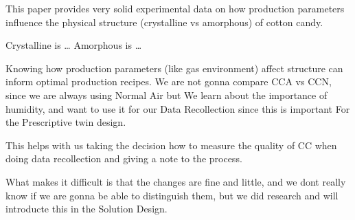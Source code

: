

This paper provides very solid experimental data on how production parameters influence the physical structure (crystalline vs amorphous) of cotton candy.

Crystalline is \dots
Amorphous is \dots


Knowing how production parameters (like gas environment) affect structure can inform optimal production recipes. We are not gonna compare CCA vs CCN, since we are always using Normal Air but
We learn about the importance of humidity, and want to use it for our Data Recollection since this is important For the Prescriptive twin design.

This helps with us taking the decision how to measure the quality of CC when doing data recollection and giving a note to the process.

What makes it difficult is that the changes are fine and little, and we dont really know if we are gonna be able to distinguish them, but we did research and will introducte this in the Solution Design.


